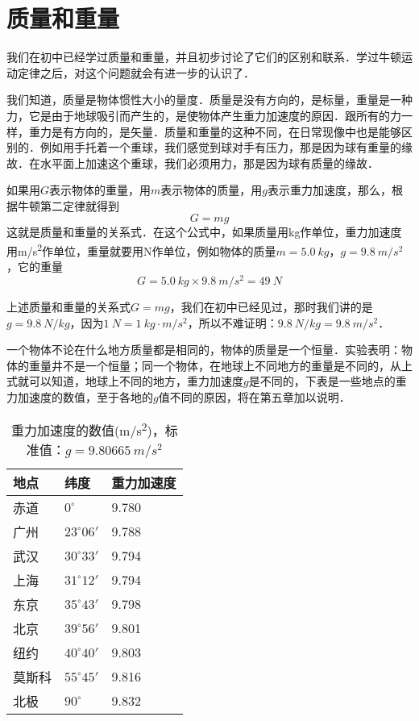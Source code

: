 \section{质量和重量}
我们在初中已经学过质量和重量，并且初步讨论了它们的区别和联系．学过牛顿运动定律之后，对这个问题就会有进一步的认识了．

我们知道，质量是物体惯性大小的量度．质量是没有方向的，是标量，重量是一种力，它是由于地球吸引而产生的，是使物体产生重力加速度的原因．跟所有的力一样，重力是有方向的，是矢量．质量和重量的这种不同，在日常现像中也是能够区别的．例如用手托着一个重球，我们感觉到球对手有压力，那是因为球有重量的缘故．在水平面上加速这个重球，我们必须用力，那是因为球有质量的缘故．

如果用$G$表示物体的重量，用$m$表示物体的质量，用$g$表示重力加速度，那么，根据牛顿第二定律就得到
\[ G=mg\]
这就是质量和重量的关系式．在这个公式中，如果质量用\si{kg}作单位，重力加速度用\si{m/s^2}作单位，重量就要用\si{N}作单位，例如物体的质量$m=\SI{5.0}{kg}$，$g=\SI{9.8}{m/s^2}$，它的重量
\[G=\SI{5.0}{kg}\times \SI{9.8}{m/s^2}=\SI{49}{N}\]

上述质量和重量的关系式$G=mg$，我们在初中已经见过，那时我们讲的是$g=\SI{9.8}{N/kg}$，因为$\SI{1}{N}=\SI{1}{kg\cdot m/s^2}$，所以不难证明：$\SI{9.8}{N/kg}=\SI{9.8}{m/s^2}$．


一个物体不论在什么地方质量都是相同的，物体的质量是一个恒量．实验表明：物体的重量井不是一个恒量；同一个物体，在地球上不同地方的重量是不同的，从上式就可以知道，地球上不同的地方，重力加速度$g$是不同的，下表是一些地点的重力加速度的数值，至于各地的$g$值不同的原因，将在第五章加以说明．
\begin{table}[H]
    \centering
    \caption{重力加速度的数值(\si{m/s^2})，标准值：$g=\SI{9.80665}{m/s^2}$
    }
    \begin{tabularx}{\textwidth}{MMM}
        \toprule[1.5pt]
        地点  & 纬度             & 重力加速度 \\
        \midrule
        赤道  & $0^\circ$      & 9.780 \\
        广州  & $23^\circ 06'$ & 9.788 \\
        武汉  & $30^\circ 33'$ & 9.794 \\
        上海  & $31^\circ 12'$ & 9.794 \\
        东京  & $35^\circ 43'$ & 9.798 \\
        北京  & $39^\circ 56'$ & 9.801 \\
        纽约  & $40^\circ 40'$ & 9.803 \\
        莫斯科 & $55^\circ 45'$ & 9.816 \\
        北极  & $90^\circ$     & 9.832 \\
        \bottomrule[1.5pt]
    \end{tabularx}
\end{table}

